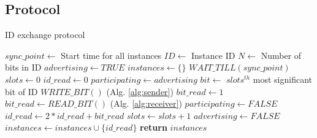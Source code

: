 \subsection{Protocol}
\label{sec:protocol}


\begin{algorithm}[!t]
\caption{ID exchange protocol }
\label{alg:protcol}
\begin{algorithmic}[1]
\STATE $sync\_point \leftarrow$ {Start time for all instances}
\STATE $ID \leftarrow$ {Instance ID}
\STATE $N \leftarrow$ {Number of bits in ID}
\STATE $advertising \leftarrow TRUE$
\STATE $instances \leftarrow \{\} $
\STATE $WAIT\_TILL(sync\_point)$
    \STATE $slots \leftarrow 0$
    \STATE $id\_read \leftarrow 0$
    \STATE $participating \leftarrow advertising$
        \STATE $bit \leftarrow$ {$slots^{th}$ most significant bit of ID}
            \STATE $WRITE\_BIT()$               (Alg. \ref{alg:sender})
            \STATE $bit\_read \leftarrow 1$
        \ELSE
            \STATE $bit\_read \leftarrow READ\_BIT()$       (Alg. \ref{alg:receiver})
                \STATE $participating \leftarrow FALSE$
            \ENDIF
        \ENDIF
        \STATE $id\_read \leftarrow 2 * id\_read + bit\_read$
        \STATE $slots \leftarrow slots + 1$
    \ENDWHILE
        \STATE $advertising \leftarrow FALSE$
    \ENDIF
    \STATE $instances \leftarrow instances \cup \{id\_read\}$
\ENDWHILE
\STATE \textbf{return} $instances$
\end{algorithmic}
\end{algorithm}

